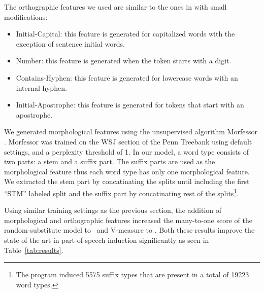 The orthographic features we used are similar to the ones in
\cite{bergkirkpatrick-EtAl:2010:NAACLHLT} with small modifications:

\begin{itemize}
\item Initial-Capital: this feature is generated for capitalized words
  with the exception of sentence initial words.
\item Number: this feature is generated when the token starts with a
  digit.
\item Contains-Hyphen: this feature is generated for lowercase words
  with an internal hyphen.
\item Initial-Apostrophe: this feature is generated for tokens that
  start with an apostrophe.
\end{itemize}

We generated morphological features using the unsupervised algorithm
Morfessor \cite{creutz05}.  Morfessor was trained on the WSJ section
of the Penn Treebank using default settings, and a perplexity
threshold of 1.  In our model, a word type consists of two parts: a
stem and a suffix part.  The suffix parts are used as the
morphological feature thus each word type has only one morphological
feature.  We extracted the stem part by concatinating the splits until
including the first ``STM'' labeled split and the suffix part by
concatinating rest of the splits\footnote{The program induced 5575
  suffix types that are present in a total of 19223 word types.}.


Using similar training settings as the previous section, the addition
of morphological and orthographic features increased the many-to-one
score of the random-substitute model to \ftmto\ and V-measure to \ftvm.
Both these results improve the state-of-the-art in part-of-speech
induction significantly as seen in Table~\ref{tab:results}.

